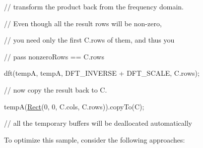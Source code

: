 {\ttfamily }

{\ttfamily // transform the product back from the frequency domain.}

{\ttfamily }

{\ttfamily }

{\ttfamily // Even though all the result rows will be non-\/zero,}

{\ttfamily }

{\ttfamily }

{\ttfamily // you need only the first C.\+rows of them, and thus you}

{\ttfamily }

{\ttfamily }

{\ttfamily // pass nonzero\+Rows == C.\+rows}

{\ttfamily }

{\ttfamily }

{\ttfamily dft(tempA, tempA, D\+F\+T\+\_\+\+I\+N\+V\+E\+R\+SE + D\+F\+T\+\_\+\+S\+C\+A\+LE, C.\+rows);}

{\ttfamily }

{\ttfamily }

{\ttfamily // now copy the result back to C.}

{\ttfamily }

{\ttfamily }

{\ttfamily tempA(\mbox{\hyperlink{classorg_1_1opencv_1_1core_1_1_rect}{Rect}}(0, 0, C.\+cols, C.\+rows)).copy\+To(\+C);}

{\ttfamily }

{\ttfamily }

{\ttfamily // all the temporary buffers will be deallocated automatically}

{\ttfamily }

{\ttfamily }

{\ttfamily To optimize this sample, consider the following approaches\+: }


